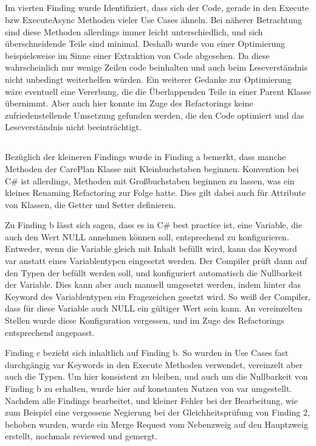 \subsection*{}
Im vierten Finding wurde Identifiziert, dass sich der Code, gerade in den Execute bzw ExecuteAsync Methoden vieler Use Cases ähneln. Bei näherer Betrachtung sind diese Methoden allerdings immer leicht unterschiedlich, und sich überschneidende Teile sind minimal. Deshalb wurde von einer Optimierung beispielsweise im Sinne einer Extraktion von Code abgesehen. Da diese wahrscheinlich nur wenige Zeilen code beinhalten und auch beim Leseverständnis nicht unbedingt weiterhelfen würden. Ein weiterer Gedanke zur Optimierung wäre eventuell eine Vererbung, die die Überlappenden Teile in einer Parent Klasse übernimmt. Aber auch hier konnte im Zuge des Refactorings keine zufriedenstellende Umsetzung gefunden werden, die den Code optimiert und das Leseverständnis nicht beeinträchtigt.
\subsection*{}
Bezüglich der kleineren Findings wurde in Finding a bemerkt, dass manche Methoden der CarePlan Klasse mit Kleinbuchstaben beginnen. Konvention bei C\# ist allerdings, Methoden mit Großbuchstaben beginnen zu lassen, was ein kleines Renaming Refactoring zur Folge hatte. Dies gilt dabei auch für Attribute von Klassen, die Getter und Setter definieren.
\par
Zu Finding b lässt sich sagen, dass es in C\# best practice ist, eine Variable, die auch den Wert NULL annehmen können soll, entsprechend zu konfigurieren. Entweder, wenn die Variable gleich mit Inhalt befüllt wird, kann das Keyword var anstatt eines Variablentypen eingesetzt werden. Der Compiler prüft dann auf den Typen der befüllt werden soll, und konfiguriert automatisch die Nullbarkeit der Variable. Dies kann aber auch manuell umgesetzt werden, indem hinter das Keyword des Variablentypen ein Fragezeichen gesetzt wird. So weiß der Compiler, dass für diese Variable auch NULL ein gültiger Wert sein kann.
An vereinzelten Stellen wurde diese Konfiguration vergessen, und im Zuge des Refactorings entsprechend angepasst.
\par
Finding c bezieht sich inhaltlich auf Finding b. So wurden in Use Cases fast durchgängig var Keywords in den Execute Methoden verwendet, vereinzelt aber auch die Typen. Um hier konsistent zu bleiben, und auch um die Nullbarkeit von Finding b zu erhalten, wurde hier auf konstanten Nutzen von var umgestellt.
Nachdem alle Findings bearbeitet, und kleiner Fehler bei der Bearbeitung, wie zum Beispiel eine vergessene Negierung bei der Gleichheitsprüfung von Finding 2, behoben wurden, wurde ein Merge Request vom Nebenzweig auf den Hauptzweig erstellt, nochmals reviewed und gemergt.

 
